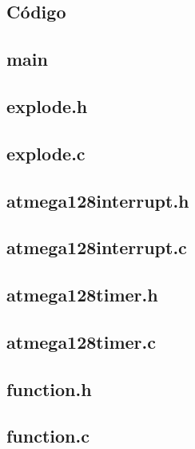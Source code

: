\begin{appendices}
	\chapter{Código}
	{
	\small
	\section*{main}
	\label{anexo-main}
	
	\newpage
	\section*{explode.h}
	\label{anexo-explode-h}
	
	\newpage
	\section*{explode.c}
	\label{anexo-explode-c}
	
	\newpage
	\section*{atmega128interrupt.h}
	\label{anexo-atmega128interrupt-h}
	
	\newpage
	\section*{atmega128interrupt.c}
	\label{anexo-atmega128interrupt-c}
	
	\newpage
	\section*{atmega128timer.h}
	\label{anexo-atmega128timer-h}
	
	\newpage
	\section*{atmega128timer.c}
	\label{anexo-atmega128timer-c}
	
	\newpage
	\section*{function.h}
	\label{anexo-function-h}
	
	\newpage
	\section*{function.c}
	\label{anexo-function-c}
	
	\newpage
}
\end{appendices}
